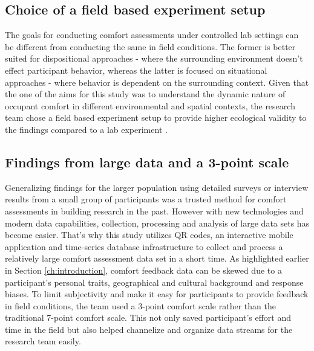 
\subsection{Choice of a field based experiment setup}
The goals for conducting comfort assessments under controlled lab settings can be different from conducting the same in field conditions. The former is better suited for dispositional approaches - where the surrounding environment doesn't effect participant behavior, whereas the latter is focused on situational approaches - where behavior is dependent on the surrounding context.
Given that the one of the aims for this study was to understand the dynamic nature of occupant comfort in different environmental and spatial contexts, the research team chose a field based experiment setup to provide higher ecological validity to the findings compared to a lab experiment \cite{andrade2018internal}.           


\subsection{Findings from large data and a 3-point scale}

Generalizing findings for the larger population using detailed surveys or interview results from a small group of participants was a trusted method for comfort assessments in building research in the past. However with new technologies and modern data capabilities, collection, processing and analysis of large data sets has become easier. That's why this study utilizes QR codes, an interactive mobile application and time-series database infrastructure to collect and process a relatively large comfort assessment data set in a short time. As highlighted earlier in Section \ref{ch:introduction}, comfort feedback data can be skewed due to a participant's personal traits, geographical and cultural background and response biases. To limit subjectivity and make it easy for participants to provide feedback in field conditions, the team used a 3-point comfort scale rather than the traditional 7-point comfort scale. This not only saved participant's effort and time in the field but also helped channelize and organize data streams for the research team easily.



